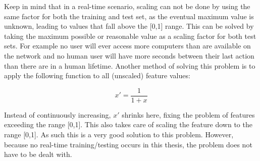 Keep in mind that in a real-time scenario, scaling can not be done by using the same factor for both the training and test set, as the eventual maximum value is unknown, leading to values that fall above the [0,1] range. This can be solved by taking the maximum possible or reasonable value as a scaling factor for both test sets. For example no user will ever access more computers than are available on the network and no human user will have more seconds between their last action than there are in a human lifetime. Another method of solving this problem is to apply the following function to all (unscaled) feature values:

\begin{equation} \label{eq:normalize_2}
x' = \dfrac{1}{1+x}
\end{equation}

Instead of continuously increasing, \(x'\) shrinks here, fixing the problem of features exceeding the range [0,1]. This also takes care of scaling the feature down to the range [0,1]. As such this is a very good solution to this problem. However, because no real-time training/testing occurs in this thesis, the problem does not have to be dealt with.


















